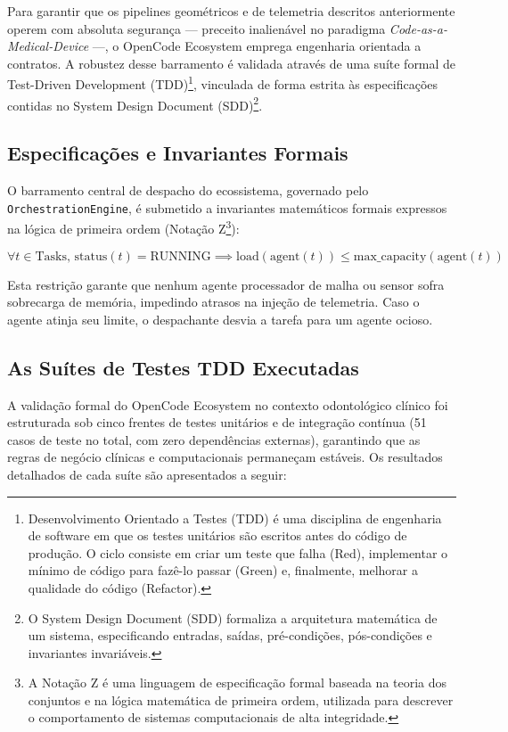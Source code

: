 Para garantir que os pipelines geométricos e de telemetria descritos anteriormente operem com absoluta segurança — preceito inalienável no paradigma \textit{Code-as-a-Medical-Device} —, o OpenCode Ecosystem emprega engenharia orientada a contratos. A robustez desse barramento é validada através de uma suíte formal de Test-Driven Development (TDD)\footnote{Desenvolvimento Orientado a Testes (TDD) é uma disciplina de engenharia de software em que os testes unitários são escritos antes do código de produção. O ciclo consiste em criar um teste que falha (Red), implementar o mínimo de código para fazê-lo passar (Green) e, finalmente, melhorar a qualidade do código (Refactor).}, vinculada de forma estrita às especificações contidas no System Design Document (SDD)\footnote{O System Design Document (SDD) formaliza a arquitetura matemática de um sistema, especificando entradas, saídas, pré-condições, pós-condições e invariantes invariáveis.}.

\subsection{Especificações e Invariantes Formais}

O barramento central de despacho do ecossistema, governado pelo \texttt{OrchestrationEngine}, é submetido a invariantes matemáticos formais expressos na lógica de primeira ordem (Notação Z\footnote{A Notação Z é uma linguagem de especificação formal baseada na teoria dos conjuntos e na lógica matemática de primeira ordem, utilizada para descrever o comportamento de sistemas computacionais de alta integridade.}):

\begin{equation}
    \forall t \in \text{Tasks}, \, \text{status}(t) = \text{RUNNING} \implies \text{load}(\text{agent}(t)) \le \text{max\_capacity}(\text{agent}(t))
\end{equation}

Esta restrição garante que nenhum agente processador de malha ou sensor sofra sobrecarga de memória, impedindo atrasos na injeção de telemetria. Caso o agente atinja seu limite, o despachante desvia a tarefa para um agente ocioso.

\subsection{As Suítes de Testes TDD Executadas}

A validação formal do OpenCode Ecosystem no contexto odontológico clínico foi estruturada sob cinco frentes de testes unitários e de integração contínua (51 casos de teste no total, com zero dependências externas), garantindo que as regras de negócio clínicas e computacionais permaneçam estáveis. Os resultados detalhados de cada suíte são apresentados a seguir:

